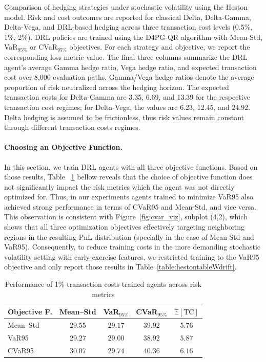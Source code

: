 \documentclass[a4paper,fleqn]{cas-dc}
\begin{document}
\begin{table}[t]
\justifying \small
Comparison of hedging strategies under stochastic volatility using the Heston model. Risk and cost outcomes are reported for classical Delta, Delta-Gamma, Delta-Vega, and DRL-based hedging across three transaction cost levels (0.5\%, 1\%, 2\%). DRL policies are trained using the D4PG-QR algorithm with Mean-Std, VaR$_{95\%}$ or CVaR$_{95\%}$ objectives. For each strategy and objective, we report the corresponding loss metric value. The final three columns summarize the DRL agent’s average Gamma hedge ratio, Vega hedge ratio, and expected transaction cost over 8,000 evaluation paths. Gamma/Vega hedge ratios denote the average proportion of risk neutralized across the hedging horizon. The expected transaction costs for Delta-Gamma are 3.35, 6.69, and 13.39 for the respective transaction cost regimes; for Delta-Vega, the values are 6.23, 12.45, and 24.92. Delta hedging is assumed to be frictionless, thus risk values remain constant through different transaction costs regimes.
\vspace{-5pt}
\label{table:hestontable}
\end{table}


\paragraph*{Choosing an Objective Function.}
In this section, we train DRL agents with all three objective functions. Based on those results, Table ~\ref{tab:1pct_agents} bellow reveals that the choice of objective function does not significantly impact the risk metrics which the agent was not directly optimized for. Thus, in our experiments agents trained to minimize VaR95 also achieved strong performance in terms of CVaR95 and Mean-Std, and vice versa. This observation is consistent with Figure~\ref{fig:cvar_viz}, subplot (4,2), which shows that all three optimization objectives effectively targeting neighboring regions in the resulting PnL distribution (specially in the case of Mean-Std and VaR95). Consequently, to reduce training costs in the more demanding stochastic volatility setting with early-exercise features, we restricted training to the VaR95 objective and only report those results in Table~\ref{table:hestontableWdrift}.

\begin{table}[width=\linewidth,cols=5,pos=H]
  \centering
  \caption{Performance of 1\%-transaction costs-trained agents across risk metrics}
  \label{tab:1pct_agents}
  \begin{tabular}{@{}lcccc@{}}
    \toprule
    \textbf{Objective F.} 
      & \textbf{Mean–Std} 
      & \textbf{VaR$_{95\%}$} 
      & \textbf{CVaR$_{95\%}$} 
      & $\mathbb{E}[\text{TC}]$ \\
    \midrule
    Mean–Std 
      & $29.55$ 
      & $29.17$ 
      & $39.92$ 
      & $5.76$ \\
    VaR95
      & $29.27$ 
      & $29.00$ 
      & $38.92$ 
      & $5.87$ \\
    CVaR95
      & $30.07$ 
      & $29.74$ 
      & $40.36$ 
      & $6.16$ \\
    \bottomrule
  \end{tabular}
\end{table}
\end{document}
